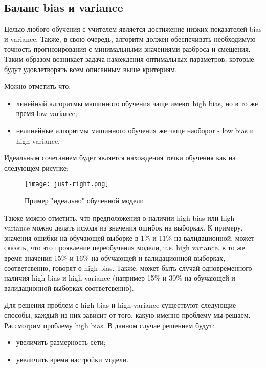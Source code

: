 \subsection{Баланс bias и variance}

Целью любого обучения с учителем является достижение низких показателей bias и variance. Также, в свою очередь, алгоритм должен обеспечивать необходимую точность прогнозирования с минимальными значениями разброса и смещения. Таким образом возникает задача нахождения оптимальных параметров, которые будут удовлетворять всем описанным выше критериям.

Можно отметить что:

\begin{itemize}
	\item линейный алгоритмы машинного обучения чаще имеют high bias, но в то же время low variance;
	\item нелинейные алгоритмы машинного обучения же чаще наоборот - low bias и high variance.
\end{itemize}

Идеальным сочетанием будет является нахождения точки обучения как на следующем рисунке:

\begin{figure}[h]
\centering
	\texttt{[image: just-right.png]}
	\caption{Пример "идеально" обученной модели}
	\label{sec:purpose:payings}
\end{figure}

Также можно отметить, что предположения о наличии high bias или high variance можно делать исходя из значения ошибок на выборках. К примеру, значения ошибки на обучающей выборке в 1\% и 11\% на валидационной, может сказать, что это проявление переобучения модели, т.е. high variance. в то же время значения 15\% и 16\% на обучающей и валидационной выборках, соответсвенно, говорят о high bias. Также, может быть случай одновременного наличия high bias и high variance (например 15\% и 30\% на обучающей и валидационной выборках соответсвенно). \cite{ang}

Для решения проблем с high bias и high variance существуют следующие способы, каждый из них зависит от того, какую именно проблему мы решаем. Рассмотрим проблему high bias. В данном случае решением будут:

\begin{itemize}
	\item увеличить размерность сети;
	\item увеличить время настройки модели.
\end{itemize}

